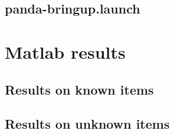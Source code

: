 \section{panda-bringup.launch}\label{sec:pandabringup}


\chapter{Matlab results}
\section{Results on known items}\label{sec:apIoUresults}
\begin{figure}[h]
 \centering 
 
\end{figure}

\clearpage
\section{Results on unknown items}\label{sec:apIoUunknownresults}
\begin{figure}[h]
 \centering 
 
\end{figure}

\clearpage